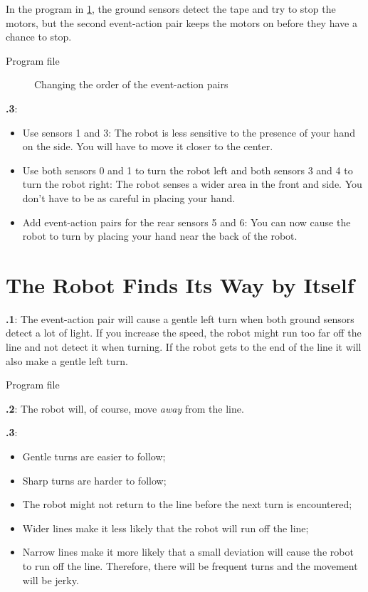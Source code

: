 \documentclass[11pt,a4paper,english]{article}
\begin{document}
In the program in \cref{fig.change}, the ground sensors
detect the tape and try to stop the motors, but the second event-action
pair keeps the motors on before they have a chance to stop.

{\raggedleft \hfill Program file }

\begin{figure}[hbt]
\begin{center}
\caption{Changing the order of the event-action pairs}\label{fig.change}
\end{center}
\end{figure}

\textbf{\thesection.3}: 
\begin{itemize}

\item Use sensors 1 and 3: The robot is less sensitive to the presence
of your hand on the side. You will have to move it closer to the center.

\item Use both sensors 0 and 1 to turn the robot left and both sensors 3
and 4 to turn the robot right: The robot senses a wider area in the
front and side. You don't have to be as careful in placing your hand.

\item Add event-action pairs for the rear sensors 5 and 6: You can now
cause the robot to turn by placing your hand near the back of the robot.

\end{itemize}


\section{The Robot Finds Its Way by Itself}


\textbf{\thesection.1}: The event-action pair 
will cause a gentle left turn when both ground sensors detect a lot of
light. If you increase the speed, the robot might run too far off the
line and not detect it when turning. If the robot gets to the end of the
line it will also make a gentle left turn.

{\raggedleft \hfill Program file }

\textbf{\thesection.2}: The robot will, of course, move \emph{away} from
the line.

\textbf{\thesection.3}:
\begin{itemize}
\item Gentle turns are easier to follow; 
\item Sharp turns are harder to follow; 
\item The robot might not return to the line before
the next turn is encountered;
\item Wider lines make it less likely that the robot will run off the line; 
\item Narrow lines make it more likely that a small deviation will cause
the robot to run off the line. Therefore, there will be frequent turns
and the movement will be jerky.
\end{itemize}
\end{document}
